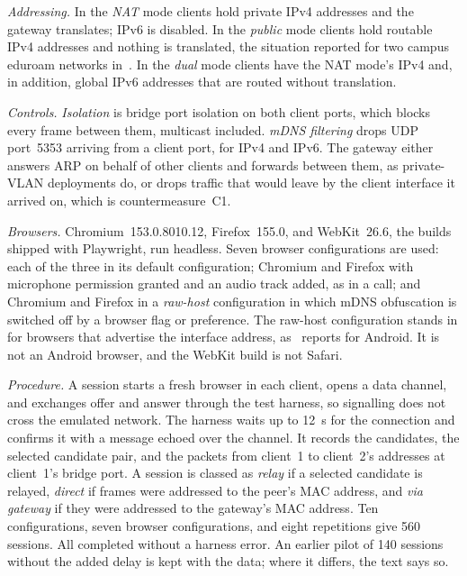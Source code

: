 \documentclass[conference]{IEEEtran}
\begin{document}
\textit{Addressing.} In the \textit{NAT} mode clients hold private IPv4 addresses and the gateway translates; IPv6 is disabled. In the \textit{public} mode clients hold routable IPv4 addresses and nothing is translated, the situation reported for two campus eduroam networks in~\cite{nibert2025}. In the \textit{dual} mode clients have the NAT mode's IPv4 and, in addition, global IPv6 addresses that are routed without translation.

\textit{Controls.} \textit{Isolation} is bridge port isolation on both client ports, which blocks every frame between them, multicast included. \textit{mDNS filtering} drops UDP port~5353 arriving from a client port, for IPv4 and IPv6. The gateway either answers ARP on behalf of other clients and forwards between them, as private-VLAN deployments do, or drops traffic that would leave by the client interface it arrived on, which is countermeasure~C1.

\textit{Browsers.} Chromium~153.0.8010.12, Firefox~155.0, and WebKit~26.6, the builds shipped with Playwright, run headless. Seven browser configurations are used: each of the three in its default configuration; Chromium and Firefox with microphone permission granted and an audio track added, as in a call; and Chromium and Firefox in a \textit{raw-host} configuration in which mDNS obfuscation is switched off by a browser flag or preference. The raw-host configuration stands in for browsers that advertise the interface address, as~\cite{koysha2025} reports for Android. It is not an Android browser, and the WebKit build is not Safari.

\textit{Procedure.} A session starts a fresh browser in each client, opens a data channel, and exchanges offer and answer through the test harness, so signalling does not cross the emulated network. The harness waits up to 12~s for the connection and confirms it with a message echoed over the channel. It records the candidates, the selected candidate pair, and the packets from client~1 to client~2's addresses at client~1's bridge port. A session is classed as \textit{relay} if a selected candidate is relayed, \textit{direct} if frames were addressed to the peer's MAC address, and \textit{via gateway} if they were addressed to the gateway's MAC address. Ten configurations, seven browser configurations, and eight repetitions give 560 sessions. All completed without a harness error. An earlier pilot of 140 sessions without the added delay is kept with the data; where it differs, the text says so.
\end{document}

